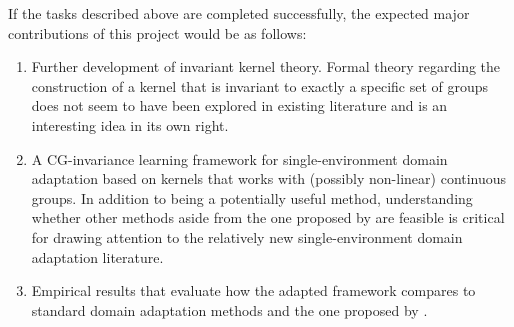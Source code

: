 If the tasks described above are completed successfully, the expected major contributions of this project would be as follows:

\begin{enumerate}

\item
Further development of invariant kernel theory. Formal theory regarding the construction of a kernel that is invariant to exactly a specific set of groups does not seem to have been explored in existing literature and is an interesting idea in its own right.

\item
A CG-invariance learning framework for single-environment domain adaptation based on kernels that works with (possibly non-linear) continuous groups. In addition to being a potentially useful method, understanding whether other methods aside from the one proposed by \citeauthor{Mouli:2021} are feasible is critical for drawing attention to the relatively new single-environment domain adaptation literature.

\item
Empirical results that evaluate how the adapted framework compares to standard domain adaptation methods and the one proposed by \citeauthor{Mouli:2021}.

\end{enumerate}

\iffalse
\begin{itemize}

\item
Setting: $\calY=\bbR$, $\calG_1,\ldots,\calG_m$ compact with Haar measures $\lambda_1,\ldots,\lambda_m$, $\calG_\calI\trianglelefteq\calG_{\calD\cup\calI}$

\item
Idea: adapt original algorithm to use kernel regression rather than neural networks. Instead of finding bases of eigenspaces and learning the coefficients to learn invariances, do multiple kernel regression where the kernels are invariant to actions of subsets of groups and learn the invariances by learning the weights

\item
Contributions if successful: development of invariant kernel theory (constructing kernels invariant to a specific set of groups and no more), CG-invariance learning framework that allows for potentially infinite dimensional feature space and (possibly non-linear) continuous groups

\item
Main tasks:
\begin{enumerate}
\item
Show how to construct kernels that are invariant to multiple groups and not invariant to overgroups (if possible)
\item
Formalize theory under which construction holds (analogous to Lemmas 1, 2 and Theorem 3 for original paper) or why not possible
\item
Introduce kernel-version of framework and adapt optimization objective for kernel regression (if 1 and 2 successful)
\end{enumerate}

\end{itemize}
\fi

